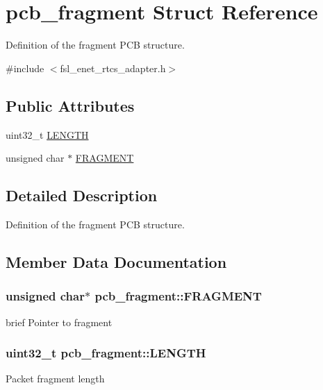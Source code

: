 \hypertarget{structpcb__fragment}{}\section{pcb\+\_\+fragment Struct Reference}
\label{structpcb__fragment}


Definition of the fragment P\+CB structure.  




{\ttfamily \#include $<$fsl\+\_\+enet\+\_\+rtcs\+\_\+adapter.\+h$>$}

\subsection*{Public Attributes}
\begin{DoxyCompactItemize}
\item 
uint32\+\_\+t \hyperlink{structpcb__fragment_a447ce67bce356a9ea97793661cfd5154}{L\+E\+N\+G\+TH}
\item 
unsigned char $\ast$ \hyperlink{structpcb__fragment_adfe38b4b97eb2d1314469ec7893f54e6}{F\+R\+A\+G\+M\+E\+NT}
\end{DoxyCompactItemize}


\subsection{Detailed Description}
Definition of the fragment P\+CB structure. 

\subsection{Member Data Documentation}
\subsubsection[{\texorpdfstring{F\+R\+A\+G\+M\+E\+NT}{FRAGMENT}}]{\setlength{\rightskip}{0pt plus 5cm}unsigned char$\ast$ pcb\+\_\+fragment\+::\+F\+R\+A\+G\+M\+E\+NT}\hypertarget{structpcb__fragment_adfe38b4b97eb2d1314469ec7893f54e6}{}\label{structpcb__fragment_adfe38b4b97eb2d1314469ec7893f54e6}
brief Pointer to fragment 
\subsubsection[{\texorpdfstring{L\+E\+N\+G\+TH}{LENGTH}}]{\setlength{\rightskip}{0pt plus 5cm}uint32\+\_\+t pcb\+\_\+fragment\+::\+L\+E\+N\+G\+TH}\hypertarget{structpcb__fragment_a447ce67bce356a9ea97793661cfd5154}{}\label{structpcb__fragment_a447ce67bce356a9ea97793661cfd5154}
Packet fragment length 

